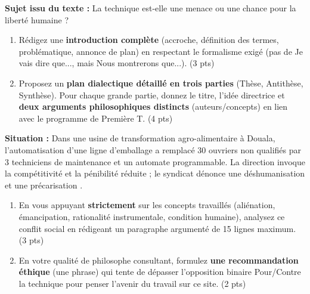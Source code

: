 \documentclass[11pt]{article}
\begin{document}
\begin{exercice}
\textbf{Sujet issu du texte :} \og La technique est-elle une menace ou une chance pour la liberté humaine ? \fg{}

\begin{enumerate}
    \item Rédigez une \textbf{introduction complète} (accroche, définition des termes, problématique, annonce de plan) en respectant le formalisme exigé (pas de \og Je vais dire que...\fg{}, mais \og Nous montrerons que...\fg{}). \hfill (3 pts)
    \item Proposez un \textbf{plan dialectique détaillé en trois parties} (Thèse, Antithèse, Synthèse). Pour chaque grande partie, donnez le titre, l'idée directrice et \textbf{deux arguments philosophiques distincts} (auteurs/concepts) en lien avec le programme de Première T. \hfill (4 pts)
\end{enumerate}
\end{exercice}

\begin{exercice}
\textbf{Situation :} Dans une usine de transformation agro-alimentaire à Douala, l'automatisation d'une ligne d'emballage a remplacé 30 ouvriers non qualifiés par 3 techniciens de maintenance et un automate programmable. La direction invoque la \og compétitivité \fg{} et la \og pénibilité réduite \fg{} ; le syndicat dénonce une \og déshumanisation \fg{} et une \og précarisation \fg{}.

\begin{enumerate}
    \item En vous appuyant \textbf{strictement} sur les concepts travaillés (aliénation, émancipation, rationalité instrumentale, condition humaine), analysez ce conflit social en rédigeant un paragraphe argumenté de 15 lignes maximum. \hfill (3 pts)
    \item En votre qualité de philosophe consultant, formulez \textbf{une recommandation éthique} (une phrase) qui tente de dépasser l'opposition binaire \og Pour/Contre la technique \fg{} pour penser l'avenir du travail sur ce site. \hfill (2 pts)
\end{enumerate}
\end{exercice}
\end{document}
